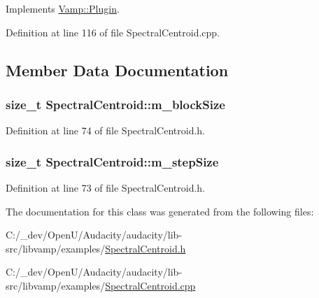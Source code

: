 Implements \hyperlink{class_vamp_1_1_plugin_aad67dc9d0052417511070c4ebcfbf24f}{Vamp\+::\+Plugin}.



Definition at line 116 of file Spectral\+Centroid.\+cpp.



\subsection{Member Data Documentation}
\subsubsection[{\texorpdfstring{m\+\_\+block\+Size}{m_blockSize}}]{\setlength{\rightskip}{0pt plus 5cm}size\+\_\+t Spectral\+Centroid\+::m\+\_\+block\+Size\hspace{0.3cm}{\ttfamily [protected]}}\hypertarget{class_spectral_centroid_a262f583d71b442bb2d80023e7c85aa4e}{}\label{class_spectral_centroid_a262f583d71b442bb2d80023e7c85aa4e}


Definition at line 74 of file Spectral\+Centroid.\+h.

\subsubsection[{\texorpdfstring{m\+\_\+step\+Size}{m_stepSize}}]{\setlength{\rightskip}{0pt plus 5cm}size\+\_\+t Spectral\+Centroid\+::m\+\_\+step\+Size\hspace{0.3cm}{\ttfamily [protected]}}\hypertarget{class_spectral_centroid_a49805a090ba58477da4adbefea4392a7}{}\label{class_spectral_centroid_a49805a090ba58477da4adbefea4392a7}


Definition at line 73 of file Spectral\+Centroid.\+h.



The documentation for this class was generated from the following files\+:\begin{DoxyCompactItemize}
\item 
C\+:/\+\_\+dev/\+Open\+U/\+Audacity/audacity/lib-\/src/libvamp/examples/\hyperlink{_spectral_centroid_8h}{Spectral\+Centroid.\+h}\item 
C\+:/\+\_\+dev/\+Open\+U/\+Audacity/audacity/lib-\/src/libvamp/examples/\hyperlink{_spectral_centroid_8cpp}{Spectral\+Centroid.\+cpp}\end{DoxyCompactItemize}
